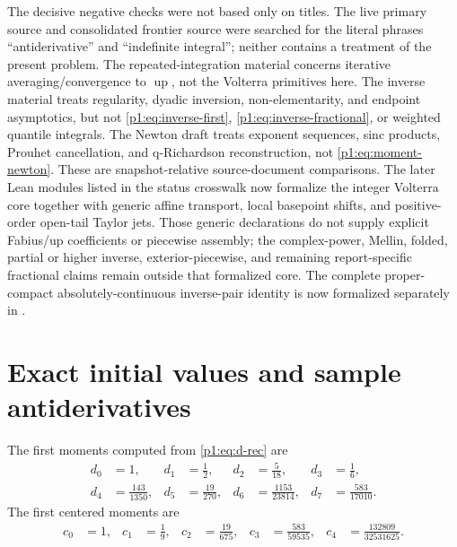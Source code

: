 \documentclass[11pt,oneside]{article}
\theoremstyle{definition}
\theoremstyle{remark}
\newcommand{\Up}{\operatorname{up}}
\newcommand{\1}{\mathbf 1}
\begin{document}
The decisive negative checks were not based only on titles.  The live primary
source and consolidated frontier source were searched for the literal phrases
``antiderivative'' and ``indefinite integral''; neither contains a treatment of
the present problem.  The repeated-integration material concerns iterative
averaging/convergence to \(\Up\), not the Volterra primitives here.  The
inverse material treats regularity, dyadic inversion, non-elementarity, and
endpoint asymptotics, but not \eqref{p1:eq:inverse-first},
\eqref{p1:eq:inverse-fractional}, or weighted quantile integrals.  The Newton draft
treats exponent sequences, sinc products, Prouhet cancellation, and
q-Richardson reconstruction, not \eqref{p1:eq:moment-newton}.  These are
snapshot-relative source-document comparisons.  The later Lean modules listed
in the status crosswalk now formalize the integer Volterra core together with
generic affine transport, local basepoint shifts, and positive-order open-tail
Taylor jets.  Those generic declarations do not supply explicit Fabius/up
coefficients or piecewise assembly; the complex-power, Mellin, folded, partial or higher
inverse, exterior-piecewise, and remaining report-specific fractional claims remain
outside that formalized core.  The complete proper-compact absolutely-continuous
inverse-pair identity is now
formalized separately in .

\section{Exact initial values and sample antiderivatives}

The first moments computed from \eqref{p1:eq:d-rec} are
\begin{align*}
 d_0&=1,&
 d_1&=\frac12,&
 d_2&=\frac5{18},&
 d_3&=\frac16,\\
 d_4&=\frac{143}{1350},&
 d_5&=\frac{19}{270},&
 d_6&=\frac{1153}{23814},&
 d_7&=\frac{583}{17010}.
\end{align*}
The first centered moments are
\begin{align*}
 c_0&=1,&
 c_1&=\frac19,&
 c_2&=\frac{19}{675},&
 c_3&=\frac{583}{59535},&
 c_4&=\frac{132809}{32531625}.
\end{align*}
\end{document}
